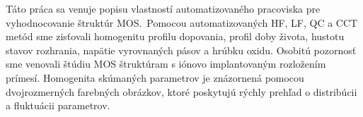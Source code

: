 Táto práca sa venuje popisu vlastností automatizovaného pracoviska pre
vyhodnocovanie štruktúr MOS.\ Pomocou automatizovaných HF, LF, QC a
CCT metód sme zisťovali homogenitu profilu dopovania, profil doby
života, hustotu stavov rozhrania, napätie vyrovnaných pásov a hrúbku
oxidu. Osobitú pozornosť sme venovali štúdiu MOS štruktúram s iónovo
implantovaným rozložením prímesí. Homogenita skúmaných parametrov je
znázornená pomocou dvojrozmerných farebných obrázkov, ktoré poskytujú
rýchly prehľad o distribúcii a fluktuácii parametrov.
